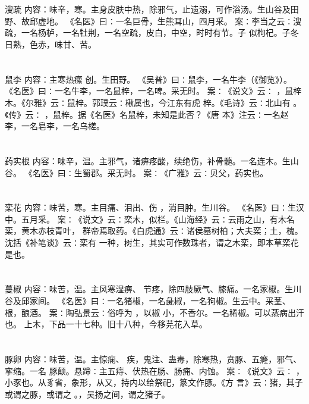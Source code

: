 \documentclass[12pt,UTF8]{ctexbook}
\begin{document}
\chapter{}溲疏
内容：味辛，寒。主身皮肤中热，除邪气，止遗溺，可作浴汤。生山谷及田野、故邱虚地。 
《名医》曰∶一名巨骨，生熊耳山，四月采。 
案∶李当之云∶溲疏，一名杨栌，一名牡荆，一名空疏，皮白，中空，时时有节。子 
似枸杞。子冬日熟，色赤，味甘、苦。 


\chapter{}鼠李
内容：主寒热瘰 创。生田野。 
《吴普》曰∶鼠李，一名牛李（《御览》）。 
《名医》曰∶一名牛李，一名鼠梓，一名啤。采无时。 
案∶《说文》云∶ ，鼠梓木。《尔雅》云∶鼠梓。郭璞云∶楸属也，今江东有虎 
梓。《毛诗》云∶北山有 。《传》云∶ ，鼠梓。据《名医》名鼠梓，未知是此否？《唐 
本》注云∶一名赵李，一名皂李，一名乌槎。 


\chapter{}药实根
内容：味辛，温。主邪气，诸痹疼酸，续绝伤，补骨髓。一名连木。生山谷。 
《名医》曰∶生蜀郡。采无时。 
案∶《广雅》云∶贝父，药实也。 


\chapter{}栾花
内容：味苦，寒。主目痛、泪出、伤 ，消目肿。生川谷。 
《名医》曰∶生汉中。五月采。 
案∶《说文》云∶栾木，似栏。《山海经》云∶云雨之山，有木名栾，黄木赤枝青叶， 
群帝焉取药。《白虎通》云∶诸侯墓树柏；大夫栾；土，槐。沈括《补笔谈》云∶栾有 
一种，树生，其实可作数珠者，谓之木栾，即本草栾花是也。 


\chapter{}蔓椒
内容：味苦，温。主风寒湿痹、 节疼，除四肢厥气、膝痛。一名家椒。生川谷及邱家间。 
《名医》曰∶一名猪椒，一名彘椒，一名狗椒。生云中。采茎、根，酿酒。 
案∶陶弘景云∶俗呼为 ，以椒 小，不香尔。一名稀椒。可以蒸病出汗也。 
上木，下品一十七种。旧十八种，今移芫花入草。 


\chapter{}豚卵
内容：味苦，温。主惊痫、 疾，鬼注、蛊毒，除寒热，贲豚、五癃，邪气、挛缩。一名 
豚颠。悬蹄∶主五痔、伏热在肠、肠痈、内蚀。 
案∶《说文》云∶ ，小豕也。从豸省，象形，从又，持内以给祭祀，篆文作豚。《方 
言》云∶猪，其子或谓之豚，或谓之 。，吴扬之间，谓之猪子。 
\end{document}
